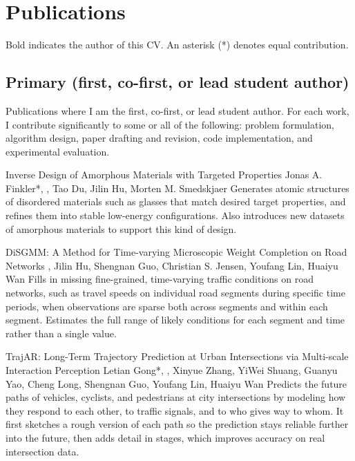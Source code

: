 \label{sec:pub}
\section*{Publications}
Bold indicates the author of this CV. An asterisk (*) denotes equal contribution.

\subsection*{Primary (first, co-first, or lead student author)}
Publications where I am the first, co-first, or lead student author. For each work, I contribute significantly to some or all of the following: problem formulation, algorithm design, paper drafting and revision, code implementation, and experimental evaluation.

{Inverse Design of Amorphous Materials with Targeted Properties}
{Jonas A. Finkler*, \me*, Tao Du, Jilin Hu, Morten M. Smedskjaer}
{Generates atomic structures of disordered materials such as glasses that match desired target properties, and refines them into stable low-energy configurations. Also introduces new datasets of amorphous materials to support this kind of design.}

{DiSGMM: A Method for Time-varying Microscopic Weight Completion on Road Networks}
{\me, Jilin Hu, Shengnan Guo, Christian S. Jensen, Youfang Lin, Huaiyu Wan}
{Fills in missing fine-grained, time-varying traffic conditions on road networks, such as travel speeds on individual road segments during specific time periods, when observations are sparse both across segments and within each segment. Estimates the full range of likely conditions for each segment and time rather than a single value.}

{TrajAR: Long-Term Trajectory Prediction at Urban Intersections via Multi-scale Interaction Perception}
{Letian Gong*, \me*, Xinyue Zhang, YiWei Shuang, Guanyu Yao, Cheng Long, Shengnan Guo, Youfang Lin, Huaiyu Wan}
{Predicts the future paths of vehicles, cyclists, and pedestrians at city intersections by modeling how they respond to each other, to traffic signals, and to who gives way to whom. It first sketches a rough version of each path so the prediction stays reliable further into the future, then adds detail in stages, which improves accuracy on real intersection data.}

